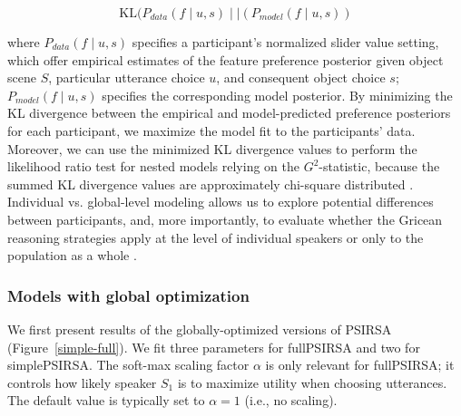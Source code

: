 \documentclass[10pt,a4paper]{article}
\begin{document}
$$\textrm{KL}(P_{data}(f \mid u,s)\mid\mid (P_{model}(f\mid u,s))$$

\noindent where $P_{data}(f\mid u,s)$ specifies a participant's normalized slider value setting, which offer empirical estimates of the feature preference posterior given object scene $S$, particular utterance choice $u$, and consequent object choice $s$;
$P_{model}(f\mid u,s)$ specifies the corresponding model posterior. 
By minimizing the KL divergence between the empirical and model-predicted preference posteriors for each participant, we maximize the model fit to the participants' data. 
Moreover, we can use the minimized KL divergence values to perform the likelihood ratio test for nested models relying on the $G^2$-statistic, because the summed KL divergence values are approximately chi-square distributed \cite{Lewandowsky:2011}. 
Individual vs. global-level modeling allows us to explore potential differences between participants, and, more importantly, to evaluate whether the Gricean reasoning strategies apply at the level of individual speakers or only to the population as a whole \cite{franke2016reasoning}. 


\subsubsection{Models with global optimization}

We first present results of the globally-optimized versions of  PSIRSA  (Figure~\ref{simple-full}).
We fit three parameters for fullPSIRSA and two for simplePSIRSA.
The soft-max scaling factor $\alpha$ is only relevant for fullPSIRSA; it  controls how likely speaker $S_1$ is to maximize utility when choosing utterances. 
The default value is typically set to $\alpha=1$ (i.e., no scaling). 
\end{document}
